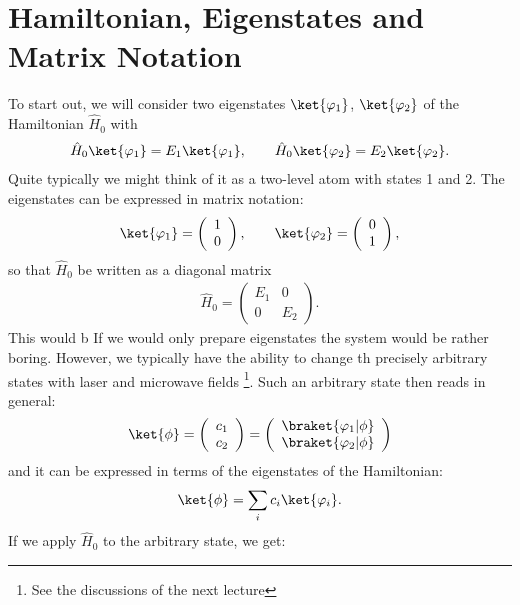 \section{Hamiltonian, Eigenstates and Matrix Notation}

To start out, we will consider two eigenstates $\ket{\varphi_1}$, $\ket{\varphi_2}$ of the Hamiltonian $\hat{H}_0$ with
\begin{align}
 \hat{H}_0\ket{\varphi_1}=E_1\ket{\varphi_1}, \qquad \hat{H}_0\ket{\varphi_2}=E_2\ket{\varphi_2}.
\end{align}
Quite typically we might think of it as a two-level atom with states 1 and 2. The eigenstates can be expressed in matrix notation:
\begin{align}
 \ket{\varphi_1}=\left( \begin{array}{c} 1 \\ 0 \end{array} \right), \qquad \ket{\varphi_2}=\left( \begin{array}{c} 0 \\ 1 \end{array} \right),
\end{align}
so that $\hat{H}_0$ be written as a diagonal matrix
\begin{align}
    \hat{H}_0 = \left(\begin{array}{cc} E_1 & 0 \\ 0 & E_2 \end{array}\right).
\end{align}
This would b
If we would only prepare eigenstates the system would be rather boring. However, we typically have the ability to change th precisely arbitrary states with laser and microwave fields \footnote{See the discussions of the next lecture}. Such an arbitrary state then reads in general:
\begin{align}
 \ket{\phi} = \left( \begin{array}{c} c_1 \\ c_2 \end{array} \right) = \left( \begin{array}{c} \braket{\varphi_1|\phi} \\ \braket{\varphi_2|\phi} \end{array} \right)
\end{align}
and it can be expressed in terms of the eigenstates of the Hamiltonian:
\begin{align}
	\ket{\phi} = \sum_i c_i \ket{\varphi_i}.
\end{align}
If we apply $\hat{H}_0$ to the arbitrary state, we get:

